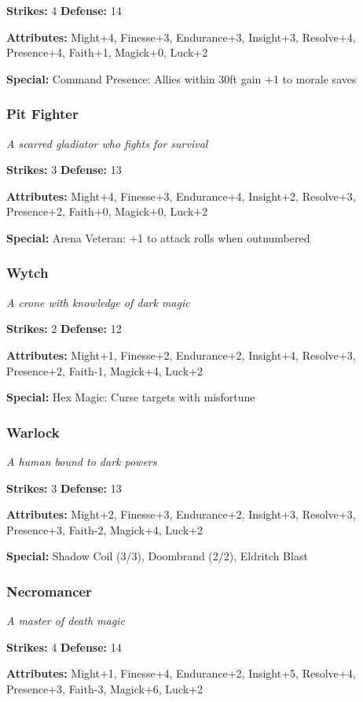 \documentclass[10pt,twoside]{article}
\begin{document}
\textbf{Strikes:} 4 \quad \textbf{Defense:} 14

\textbf{Attributes:} Might+4, Finesse+3, Endurance+3, Insight+3, Resolve+4, Presence+4, Faith+1, Magick+0, Luck+2

\textbf{Special:} Command Presence: Allies within 30ft gain +1 to morale saves

\subsubsection{Pit Fighter}
\textit{A scarred gladiator who fights for survival}

\textbf{Strikes:} 3 \quad \textbf{Defense:} 13

\textbf{Attributes:} Might+4, Finesse+3, Endurance+4, Insight+2, Resolve+3, Presence+2, Faith+0, Magick+0, Luck+2

\textbf{Special:} Arena Veteran: +1 to attack rolls when outnumbered

\subsubsection{Wytch}
\textit{A crone with knowledge of dark magic}

\textbf{Strikes:} 2 \quad \textbf{Defense:} 12

\textbf{Attributes:} Might+1, Finesse+2, Endurance+2, Insight+4, Resolve+3, Presence+2, Faith-1, Magick+4, Luck+2

\textbf{Special:} Hex Magic: Curse targets with misfortune

\subsubsection{Warlock}
\textit{A human bound to dark powers}

\textbf{Strikes:} 3 \quad \textbf{Defense:} 13

\textbf{Attributes:} Might+2, Finesse+3, Endurance+2, Insight+3, Resolve+3, Presence+3, Faith-2, Magick+4, Luck+2

\textbf{Special:} Shadow Coil (3/3), Doombrand (2/2), Eldritch Blast

\subsubsection{Necromancer}
\textit{A master of death magic}

\textbf{Strikes:} 4 \quad \textbf{Defense:} 14

\textbf{Attributes:} Might+1, Finesse+4, Endurance+2, Insight+5, Resolve+4, Presence+3, Faith-3, Magick+6, Luck+2
\end{document}
